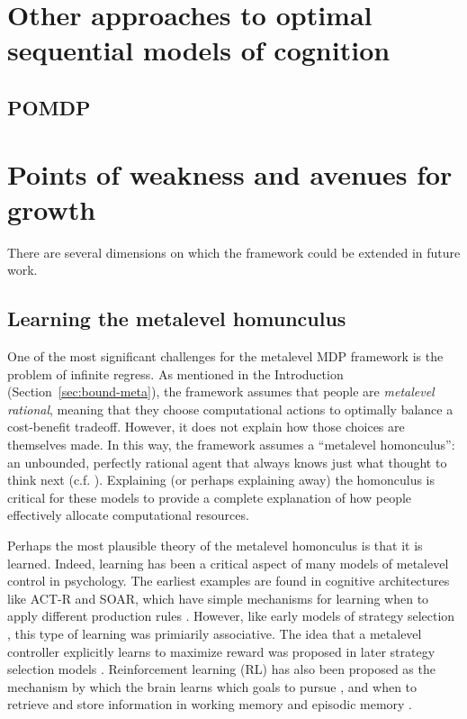 \label{conclusion}




\section{Other approaches to optimal sequential models of cognition}



\subsection{POMDP}\label{sec:alternative-pomdp}


\section{Points of weakness and avenues for growth}

There are several dimensions on which the framework could be extended in future work.

\subsection{Learning the metalevel homunculus}

One of the most significant challenges for the metalevel MDP framework is the problem of infinite regress. As mentioned in the Introduction (Section~\ref{sec:bound-meta}), the framework assumes that people are \emph{metalevel rational}, meaning that they choose computational actions to optimally balance a cost-benefit tradeoff. However, it does not explain how those choices are themselves made. In this way, the framework assumes a ``metalevel homonculus'': an unbounded, perfectly rational agent that always knows just what thought to think next (c.f. \citealp{hazy2006banishing,botvinick2014computational}). Explaining (or perhaps explaining away) the homonculus is critical for these models to provide a complete explanation of how people effectively allocate computational resources.

Perhaps the most plausible theory of the metalevel homonculus is that it is learned. Indeed, learning has been a critical aspect of many models of metalevel control in psychology. The earliest examples are found in cognitive architectures like ACT-R and SOAR, which have simple mechanisms for learning when to apply different production rules \citep{laird1986chunking}. However, like early models of strategy selection \citep{shrager1998scads}, this type of learning was primiarily associative. The idea that a metalevel controller explicitly learns to maximize reward was proposed in later strategy selection models \citet{erev2005adaptation,rieskamp2006ssl,lieder2017strategy}. Reinforcement learning (RL) has also been proposed as the mechanism by which the brain learns which goals to pursue \citep{cushman2015habitual}, and when to retrieve and store information in working memory \citep{oreilly2006making,todd2008learning} and episodic memory \citep{lu2022neural}. 

